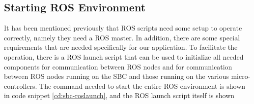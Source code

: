 \subsection{Starting ROS Environment}
It has been mentioned previously that ROS scripts need some setup to operate correctly, namely they need a ROS master. In addition, there are some special requirements that are needed specifically for our application. To facilitate the operation, there is a ROS launch script that can be used to initialize all needed components for communication between ROS nodes and for communication between ROS nodes running on the SBC and those running on the various micro-controllers. The command needed to start the entire ROS environment is shown in code snippet \ref{cd:sbc-roslaunch}, and the ROS launch script itself is shown



\newpage
